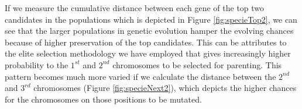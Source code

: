 If we measure the cumulative distance between each gene of the top two candidates in the populations which is depicted in Figure \ref{fig:specieTop2}, we can see that the larger populations in genetic evolution hamper the evolving chances because of higher preservation of the top candidates. This can be attributes to the elite selection methodology we have employed that gives increasingly higher probability to the $1^{st}$ and $2^{nd}$ chromosomes to be selected for parenting.
This pattern becomes much more varied if we calculate the distance between the $2^{nd}$ and $3^{rd}$ chromosomes (Figure \ref{fig:specieNext2}), which depicts the higher chances for the chromosomes on those positions to be mutated.
